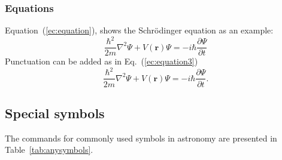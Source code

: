 \documentclass[10pt,letter,twoside]{rmaa-rho-class/rmac-rho}
\begin{document}
\subsubsection{Equations}

Equation~(\ref{ec:equation}), shows the Schrödinger equation as an example:     \begin{equation} \label{ec:equation}
         \frac{\hbar^2}{2m}\nabla^2\Psi + V(\mathbf{r})\Psi = -i\hbar \frac{\partial\Psi}{\partial t}
    \end{equation} 
Punctuation can be added as in Eq.~(\ref{ec:equation3})
    \begin{equation} \label{ec:equation3}
         \frac{\hbar^2}{2m} \nabla^2\Psi + V(\mathbf{r})\Psi = -i\hbar \frac{\partial\Psi}{\partial t}.
    \end{equation} 
    
\subsection{Special symbols}

The commands for commonly used symbols in astronomy are presented in Table~\ref{tab:anysymbols}.
\end{document}
